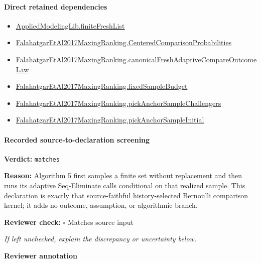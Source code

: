 \documentclass[10pt]{article}
\newcommand{\reviewerbox}{%
  \par\noindent\fbox{\parbox{0.96\linewidth}{\rule{0pt}{0.38in}}}\par
}
\newcommand{\reviewmatch}[1]{%
  \par\noindent\textbf{Reviewer check:} $\square$\; #1\par
  \noindent\emph{If left unchecked, explain the discrepancy or uncertainty below.}\par
}
\begin{document}
\paragraph{Direct retained dependencies}
\begin{itemize}\raggedright
\item \hyperlink{governing-declaration-9a06ef56935bbfee}{Applied\allowbreak{}Modeling\allowbreak{}Lib.\allowbreak{}finite\allowbreak{}Fresh\allowbreak{}List}
\item \hyperlink{paper-prerequisite-b99b697ef57f53ce}{Falahatgar\allowbreak{}Et\allowbreak{}Al2017\allowbreak{}Maxing\allowbreak{}Ranking.\allowbreak{}Centered\allowbreak{}Comparison\allowbreak{}Probabilities}
\item \hyperlink{governing-declaration-a86a89a19db0ed14}{Falahatgar\allowbreak{}Et\allowbreak{}Al2017\allowbreak{}Maxing\allowbreak{}Ranking.\allowbreak{}canonical\allowbreak{}Fresh\allowbreak{}Adaptive\allowbreak{}Compare\allowbreak{}Outcome\allowbreak{}Law}
\item \hyperlink{governing-declaration-4b4daf4bb2493573}{Falahatgar\allowbreak{}Et\allowbreak{}Al2017\allowbreak{}Maxing\allowbreak{}Ranking.\allowbreak{}fixed\allowbreak{}Sample\allowbreak{}Budget}
\item \hyperlink{governing-declaration-c8d9290e92212aa4}{Falahatgar\allowbreak{}Et\allowbreak{}Al2017\allowbreak{}Maxing\allowbreak{}Ranking.\allowbreak{}pick\allowbreak{}Anchor\allowbreak{}Sample\allowbreak{}Challengers}
\item \hyperlink{governing-declaration-b15494712a2419b8}{Falahatgar\allowbreak{}Et\allowbreak{}Al2017\allowbreak{}Maxing\allowbreak{}Ranking.\allowbreak{}pick\allowbreak{}Anchor\allowbreak{}Sample\allowbreak{}Initial}
\end{itemize}
\paragraph{Recorded source-to-declaration screening}
\textbf{Verdict:} \texttt{matches}
\\
{\raggedright
\textbf{Reason:} Algorithm 5 first samples a finite set without replacement and then runs its adaptive Seq-\allowbreak{}Eliminate calls conditional on that realized sample.\allowbreak{} This declaration is exactly that source-\allowbreak{}faithful history-\allowbreak{}selected Bernoulli comparison kernel;\allowbreak{} it adds no outcome, assumption, or algorithmic branch.\allowbreak{}
\par}
\reviewmatch{Matches source input}
\noindent\textbf{Reviewer annotation}\par
\reviewerbox
\clearpage
\hypertarget{paper-prerequisite-9cfd680082bdff56}{}
\end{document}
